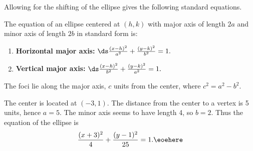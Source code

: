 Allowing for the shifting of the ellipse gives the following standard equations.
	
{The equation of an ellipse centered at $(h,k)$ with major axis of length $2a$ and minor axis of length $2b$ in standard form is:
\begin{enumerate}
	\item	\textbf{Horizontal major axis:} $\ds \frac{(x-h)^2}{a^2}+\frac{(y-k)^2}{b^2}=1.$
	\item	\textbf{Vertical major axis:} $\ds \frac{(x-h)^2}{b^2}+\frac{(y-k)^2}{a^2}=1.$
\end{enumerate}
The foci lie along the major axis, $c$ units from the center, where $c^2=a^2-b^2$.
}

{The center is located at $(-3,1)$. The distance from the center to a vertex is 5 units, hence $a=5$. The minor axis seems to have length 4, so $b=2$. Thus the equation of the ellipse is
\[\frac{(x+3)^2}{4}+\frac{(y-1)^2}{25} = 1.\eoehere\]}

